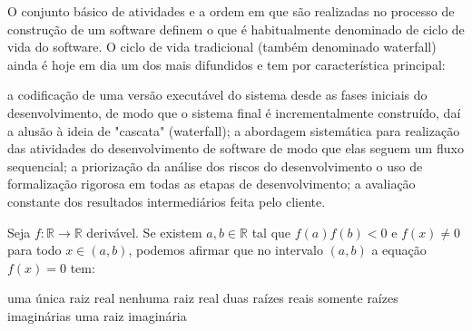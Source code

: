 \documentclass[12pt, addpoints]{exam}
\begin{document}
\begin{questions}
\question

O conjunto básico de atividades e a ordem em que são realizadas no processo de construção de um software definem o que é habitualmente denominado de ciclo de vida do software. O ciclo de vida tradicional (também denominado waterfall) ainda é hoje em dia um dos mais difundidos e tem por característica principal: 
\begin{choices}
\choice a codificação de uma versão executável do sistema desde as fases iniciais do desenvolvimento, de modo que o sistema final é incrementalmente construído, daí a alusão à ideia de "cascata" (waterfall); 
\choice a abordagem sistemática para realização das atividades do desenvolvimento de software de modo que elas seguem um fluxo sequencial; 
\choice a priorização da análise dos riscos do desenvolvimento
\choice o uso de formalização rigorosa em todas as etapas de desenvolvimento; 
\choice a avaliação constante dos resultados intermediários feita pelo cliente.
\end{choices}

\question

Seja \( f : \mathbb{R} \to \mathbb{R} \) derivável. Se existem \( a, b \in \mathbb{R} \) tal que \( f(a)f(b) < 0 \) e \( f(x) \neq 0 \) para todo \( x \in (a, b) \), podemos afirmar que no intervalo \( (a, b) \) a equação \( f(x) = 0 \) tem:
\begin{choices}
\choice uma única raiz real
\choice nenhuma raiz real
\choice duas raízes reais
\choice somente raízes imaginárias
\choice uma raiz imaginária
\end{choices}



    \end{questions}
    
\end{document}

